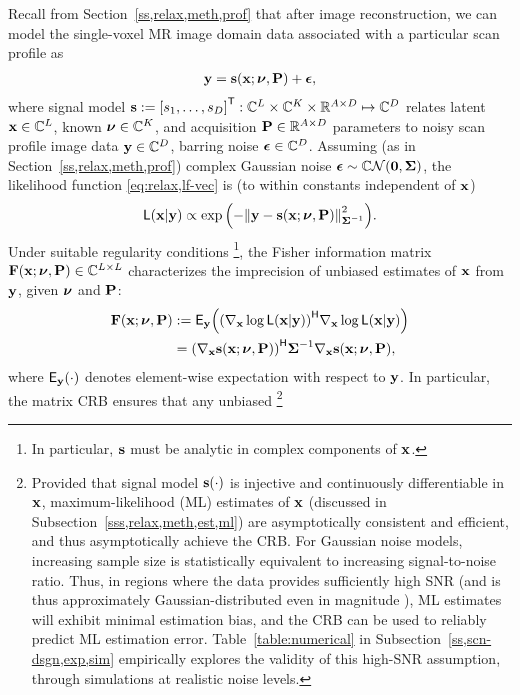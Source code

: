 Recall from Section~\ref{ss,relax,meth,prof}
that after image reconstruction,
we can model the single-voxel MR image domain data
associated with a particular scan profile as 
\begin{align}
	\bmy = \bms\paren{\bmx; \bmnu, \bmP} + \bmeps,
	\label{eq:scn-dsgn,mod-vec-abbrev}
\end{align}
where signal model
$\bms := \brac{s_1, \dots, s_D}\tpose
: \complexes{L} \times \complexes{K} \times \reals{A \times D} \mapsto \complexes{D}$
relates latent $\mathbf{x} \in \mathbb{C}^{L}$,
known $\boldsymbol{\nu} \in \mathbb{C}^{K}$,
and acquisition $\mathbf{P} \in \mathbb{R}^{A \times D}$ parameters
to noisy scan profile image data $\mathbf{y} \in \mathbb{C}^{D}$, 
barring noise $\boldsymbol{\epsilon} \in \mathbb{C}^{D}$.
Assuming (as in Section~\ref{ss,relax,meth,prof})
complex Gaussian noise $\bmeps \sim \cgauss{\mathbf{0}}{\bmSig}$,
the likelihood function \eqref{eq:relax,lf-vec} is
(to within constants independent of $\mathbf{x}$)
\begin{align}
	\Lf{\bmx|\bmy} \propto
		\expa{-\norm{\bmy - \bms\paren{\bmx; \bmnu, \bmP}}^2_{\bmSig^{-1}}}.
	\label{eq:scn-dsgn,lf-vec}
\end{align}
Under suitable regularity conditions
\footnote{In particular,
$\mathbf{s}$ must be analytic in complex components
of $\mathbf{x}$.},
the Fisher information matrix 
$\Fisher{\bmx; \bmnu, \bmP} \in \complexes{L \times L}$
\cite{fisher:1925:tos}
characterizes the imprecision 
of unbiased estimates 
of $\mathbf{x}$ from $\mathbf{y}$, 
given $\boldsymbol{\nu}$ and $\mathbf{P}$:
\begin{align}
	\Fisher{\bmx; \bmnu, \bmP} 
		&:= 
		\expect{\bmy}{\paren{\grada{\bmx} \log{\Lf{\bmx|\bmy}}}\ctpose
		\grada{\bmx} \log{\Lf{\bmx|\bmy}}} 
		\nonumber \\
		&= 
		\paren{\grada{\bmx} \bms\paren{\bmx; \bmnu, \bmP}}\ctpose
		\bmSig^{-1} \grada{\bmx} \bms\paren{\bmx; \bmnu, \bmP}
		\label{eq:scn-dsgn,fisher},
\end{align}
where $\expect{\bmy}{\cdot}$ denotes element-wise expectation
with respect to $\mathbf{y}$.
In particular,
the matrix CRB \cite{cramer:46} ensures
that any unbiased
\footnote{Provided that signal model $\bms\paren{\cdot}$
	is injective and continuously differentiable in $\mathbf{x}$, 
	maximum-likelihood (ML) estimates of $\mathbf{x}$
	(discussed in Subsection~\ref{sss,relax,meth,est,ml})
	are asymptotically consistent and efficient,
	and thus asymptotically achieve the CRB.
	For Gaussian noise models,
	increasing sample size is statistically equivalent
	to increasing signal-to-noise ratio. 
	Thus, in regions where the data provides sufficiently high SNR
	(and is thus approximately Gaussian-distributed 
	even in magnitude \cite{gudbjartsson:95:trd}), 
	ML estimates will exhibit minimal estimation bias,
	and the CRB can be used 
	to reliably predict ML estimation error.
	Table~\ref{table:numerical} in Subsection~\ref{ss,scn-dsgn,exp,sim}
	empirically explores the validity
	of this high-SNR assumption,
	through simulations
	at realistic noise levels.
} 
